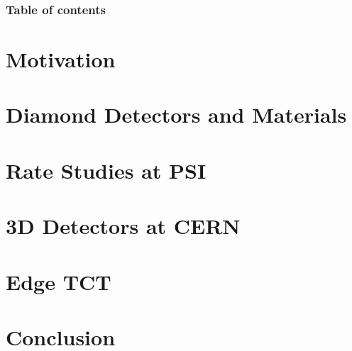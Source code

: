 \documentclass[9pt]{beamer}
\begin{document}


\begin{frame}[allowframebreaks]
	\frametitle{Table of contents}
	\tableofcontents   %
\end{frame}

\section{Motivation}


\section{Diamond Detectors and Materials}


\section{Rate Studies at PSI}


\section{3D Detectors at CERN}


\section{Edge TCT}


\section{Conclusion}


\end{document}
